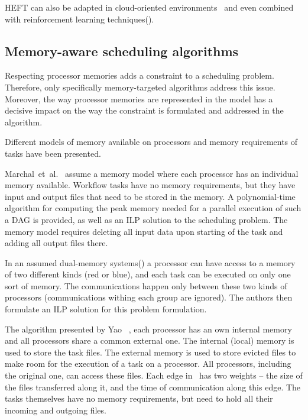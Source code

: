 \documentclass[conference]{IEEEtran}
\begin{document}
    HEFT  can also be adapted in cloud-oriented environments~\cite{samadi2018eheft} and even combined with reinforcement
    learning techniques(\cite{yano2022cqga}).

    \subsection{Memory-aware scheduling algorithms}
    Respecting processor memories adds a constraint to a scheduling problem.
    Therefore, only specifically memory-targeted algorithms address this issue.
    Moreover, the way processor memories are represented in the model has a decisive impact on the way the constraint
    is formulated and addressed in the algorithm.

    Different models of memory available on processors and memory requirements of tasks have been presented.

    Marchal~et~al.~\cite{marchal2018parallel} assume a memory model where each processor has an individual memory available.
    Workflow tasks have no memory requirements, but they have input and output files that need to be stored in the memory.
    A polynomial-time algorithm for computing the peak memory needed for a parallel execution of such a DAG is provided,
    as well as an ILP solution to the scheduling problem.
    The memory model requires deleting all input data upon starting of the task and adding all output files there.

    In an assumed dual-memory systems(\cite{herrmann2014memory}) a processor can have access to a memory of two different
    kinds (red or blue), and each task can be executed on only one sort of memory.
    The communications happen only between these two kinds of processors (communications withing each group are ignored).
    The authors then formulate an ILP solution for this problem formulation.

    The algorithm presented by Yao \etal~\cite{yao2022memory}, each processor has an own internal memory and all
    processors share a common external one. The internal (local) memory is used to store the task files.
    The external memory is used to store evicted files to make room for the execution of a task on a processor.
    All processors, including the original one, can access these files.
    Each edge in~\cite{yao2022memory} has two weights -- the size of the files transferred along it,
    and the time of communication along this edge.
    The tasks themselves have no memory requirements, but need to hold all their incoming and outgoing files.
\end{document}
